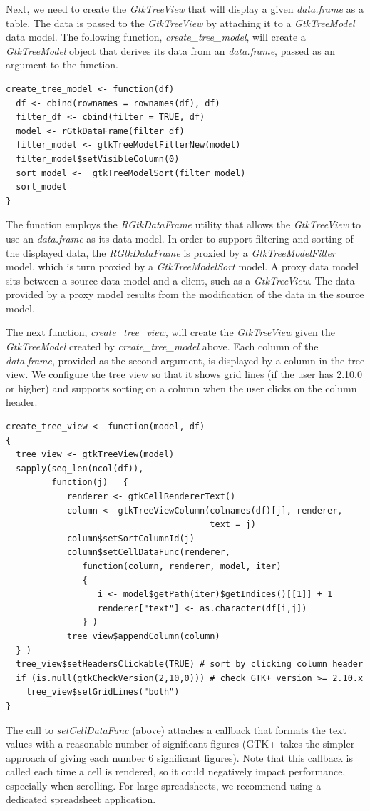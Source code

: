 \documentclass[article]{jss}
\begin{document}
Next, we need to create the \emph{GtkTreeView} that will display a
given \emph{data.frame} as a table.  The data is passed to the
\emph{GtkTreeView} by attaching it to a \emph{GtkTreeModel} data
model. The following function, \emph{create\_tree\_model}, will create a
\emph{GtkTreeModel} object that derives its data from an 
\emph{data.frame}, passed as an argument to the function. 
\begin{verbatim}
create_tree_model <- function(df)
  df <- cbind(rownames = rownames(df), df)
  filter_df <- cbind(filter = TRUE, df)
  model <- rGtkDataFrame(filter_df)
  filter_model <- gtkTreeModelFilterNew(model)
  filter_model$setVisibleColumn(0)
  sort_model <-  gtkTreeModelSort(filter_model)
  sort_model
}
\end{verbatim}
The function employs the \emph{RGtkDataFrame} utility that allows
the \emph{GtkTreeView} to use an 
\emph{data.frame} as its data model.  In order to support filtering
and sorting of the displayed data, the \emph{RGtkDataFrame} is proxied
by a \emph{GtkTreeModelFilter} model, which is turn proxied by a
\emph{GtkTreeModelSort} model. A proxy data model sits between a
source data model and a client, such as a \emph{GtkTreeView}. The data
provided by a proxy model results from the modification of the data in
the source model.

The next function, \emph{create\_tree\_view},  will create the
\emph{GtkTreeView} given the \emph{GtkTreeModel} created by
\emph{create\_tree\_model} above. Each column of the \emph{data.frame},
provided as the second argument, is displayed by a column in the tree
view. We configure the tree view so that it shows grid lines (if the user has  2.10.0 or higher) and supports sorting on a column when the user clicks on the column header. 
\begin{verbatim}
create_tree_view <- function(model, df)
{
  tree_view <- gtkTreeView(model)
  sapply(seq_len(ncol(df)),
         function(j)   {
            renderer <- gtkCellRendererText()
            column <- gtkTreeViewColumn(colnames(df)[j], renderer,
                                        text = j)
            column$setSortColumnId(j)
            column$setCellDataFunc(renderer,
               function(column, renderer, model, iter)
               {
                  i <- model$getPath(iter)$getIndices()[[1]] + 1
                  renderer["text"] <- as.character(df[i,j])
               } )
            tree_view$appendColumn(column)
  } )
  tree_view$setHeadersClickable(TRUE) # sort by clicking column header
  if (is.null(gtkCheckVersion(2,10,0))) # check GTK+ version >= 2.10.x
    tree_view$setGridLines("both")
}
\end{verbatim}
The call to \emph{setCellDataFunc} (above) attaches a callback that formats the text values with a reasonable number of significant figures (GTK+ takes the simpler approach of giving each number 6 significant figures). Note that this callback is called each time a cell is rendered, so it could negatively impact performance, especially when scrolling. For large spreadsheets, we recommend using a dedicated spreadsheet application. 
\end{document}
